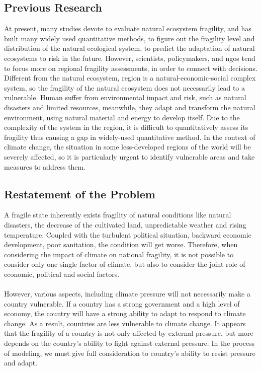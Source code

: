 \documentclass{mcmthesis}
\begin{document}
\subsection{Previous Research}
At present, many studies devote to evaluate natural ecosystem fragility, 
and has built many widely used quantitative methods, to figure out the 
fragility level and distribution of the natural ecological system, 
to predict the adaptation of natural ecosystems to risk in the future. However, 
scientists, policymakers, and ngos tend to focus more on regional 
fragility assessments, in order to connect with decisions. Different 
from the natural ecosystem, region is a natural-economic-social complex 
system, so the fragility of the natural ecosystem does not necessarily lead 
to a vulnerable. Human suffer from environmental impact and risk, such as 
natural disasters and limited resources, meanwhile, they adapt and transform 
the natural environment, using natural material and energy to develop itself.
Due to the complexity of the system in the region, it is difficult to 
quantitatively assess its fragility thus causing a gap in widely-used 
quantitative method. In the context of climate change, the situation in some
less-developed regions of the world will be severely affected, so it is 
particularly urgent to identify vulnerable areas and take measures to 
address them.


\subsection{Restatement of the Problem}
A fragile state inherently exists fragility of natural conditions 
like natural disasters, the decrease of the cultivated land, unpredictable 
weather and rising temperature. Coupled with the turbulent political situation, 
backward economic development, poor sanitation, the condition will get worse. 
Therefore, when considering the impact of climate on national fragility, 
it is not possible to consider only one single factor of climate, but also to
consider the joint role of economic, political and social factors.\\\\
However, various aspects, including climate pressure will not necessarily 
make a country vulnerable. If a country has a strong government and a high 
level of economy, the country will have a strong ability to adapt to respond
to climate change. As a result, countries are less vulnerable to climate 
change. It appears that the fragility of a country is not only affected
by external pressure, but more depends on the country's ability to fight 
against external pressure. In the process of modeling, we must give full 
consideration to country's ability to resist pressure and adapt.
\end{document}
